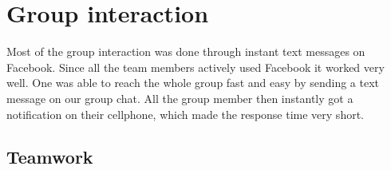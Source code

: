 \section{Group interaction}
Most of the group interaction was done through instant text messages on Facebook. Since all the team members actively used Facebook it worked very well. One was able to reach the whole group fast and easy by sending a text message on our group chat. All the group member then instantly got a notification on their cellphone, which made the response time very short.

\subsection{Teamwork}

